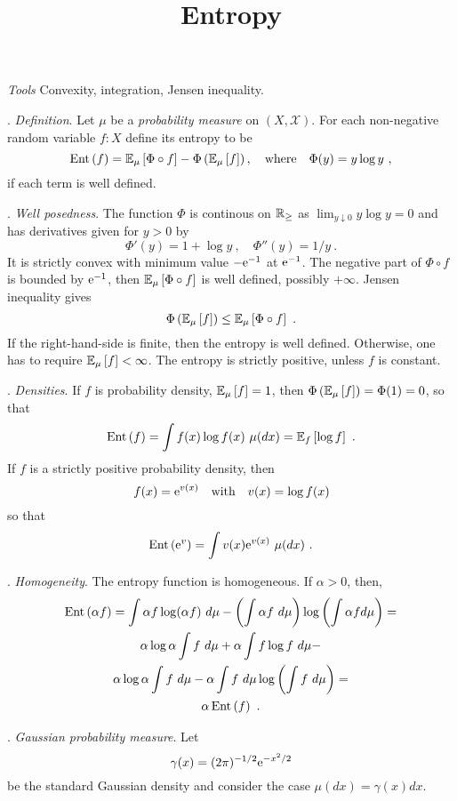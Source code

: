 \documentclass[12pt,a4paper]{amsart}
\title{Entropy}
\renewcommand{\entropyof}[1]{\operatorname{Ent}\left(#1\right)}
\begin{document}
\maketitle
\noindent\emph{Tools} Convexity, integration, Jensen inequality.

. \emph{Definition}. Let $\mu$ be a \emph{probability measure} on
$(X,\mathcal X)$. For each non-negative random variable $f \colon X$
define its entropy to be
\begin{equation*}
  \entropyof{f} = \expectat \mu {\Phi\circ f} - \Phi\left(\expectat
    \mu f\right), \quad \text{where} \quad \Phi(y) = y \log y \ ,
\end{equation*}
if each term is well defined.

. \emph{Well posedness}. The function $\Phi$ is continous
on $\mathbb{R}_\geq$ as $\lim_{y \downarrow 0} y \log y = 0$ and has
derivatives given for $y > 0$ by
\begin{equation*}
  \Phi'(y) = 1 + \log y \ , \quad \Phi''(y)= 1/y \ .  
\end{equation*}
It is strictly convex with minimum value $-\mathrm{e}^{-1}$ at
$\mathrm{e}^{-1}$. The negative part of $\Phi\circ f$ is bounded by
$\mathrm{e}^{-1}$, then $\operatorname{\mathbb E}_{\mu}\left[\Phi\circ f\right]$ is well defined,
possibly $+\infty$. Jensen inequality gives
\begin{equation*}
  \Phi\left(\operatorname{\mathbb E}_{\mu}\left[f\right]\right) \leq \operatorname{\mathbb E}_{\mu}\left[\Phi\circ f\right] \ .
\end{equation*}
If the right-hand-side is finite, then the entropy is well
defined. Otherwise, one has to require $\operatorname{\mathbb E}_{\mu}\left[f\right] < \infty$. The
entropy is strictly positive, unless $f$ is constant.

. \emph{Densities}. If $f$ is probability density,
$\operatorname{\mathbb E}_{\mu}\left[f\right] = 1$, then $\Phi\left(\operatorname{\mathbb E}_{\mu}\left[f\right]\right) =
\Phi(1) = 0$, so that
\begin{equation*}
  \entropyof f = \int f(x) \log f(x) \ \mu(dx) = \expectat f {\log f}
  \ .
\end{equation*}
If $f$ is a strictly positive probability density, then
\begin{equation*}
  f(x) = \mathrm{e}^{v(x)} \quad \text{with} \quad v(x) = \log f(x)
\end{equation*}
so that
\begin{equation*}
  \entropyof{\euler^{v}} = \int v(x) \euler^{v(x)} \ \mu(dx) \ .
\end{equation*}

. \emph{Homogeneity}. The entropy function is homogeneous. If $\alpha
> 0$, then,
\begin{multline*}
  \entropyof{\alpha f} = \int \alpha f \log (\alpha f) \ d\mu - \left(\int
    \alpha f \ d\mu\right) \logof{\int \alpha f  d\mu} = \\
  \alpha \log \alpha \int f \ d\mu + \alpha \int f \log f \ d\mu - \\
  \alpha \log \alpha \int f \ d\mu - \alpha \int f \ d\mu \logof{\int
    f \ d\mu} = \\ \alpha \entropyof f \ .
\end{multline*}

. \emph{Gaussian probability measure}. Let
\begin{equation*}
  \gamma(x) = (2\pi)^{-1/2} \mathrm{e}^{-x^2/2}
\end{equation*}
be the standard Gaussian density and consider the case $\mu(dx) =
\gamma(x) dx$.
\end{document}
